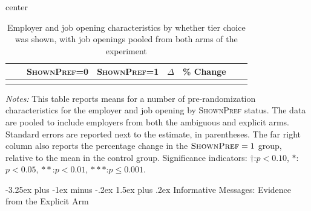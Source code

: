 \documentclass[12pt]{article}
\makeatletter
\renewcommand{\subsection}{%
  \@startsection{subsection}{2}{\z@}%
  {-3.25ex plus -1ex minus -.2ex}%
  {1.5ex plus .2ex}%
  {\normalfont\large\bfseries}%
}
\newcommand{\starlanguage}{Significance indicators: $\dagger$:$p < 0.10$, $*$:$p < 0.05$, $**$:$p < 0.01$, $***$:$p \le 0.001$.}
\makeatother
\begin{document}
\begin{table}[h!]
\begin{center}
\caption{Employer and job opening characteristics by whether tier choice was shown, with job openings pooled from both arms of the experiment}
\label{tab:balance_big}
\begin{small}
\begin{adjustbox}{center}
\begin{tabular}{lllccccc}
\toprule
&   & \multicolumn{1}{c}{\parbox[t][][t]{2.3cm}{{\footnotesize \textsc{ShownPref}=0}}}
&     \multicolumn{1}{c}{\parbox[t][][t]{2.3cm}{\footnotesize  \textsc{ShownPref=1}}}
&     \multicolumn{1}{c}{\parbox[t][][t]{2.0cm}{$\Delta$}}
&     \multicolumn{1}{c}{\parbox[t][][t]{1cm}{\% Change}}
\\
\hline

 \\
\bottomrule
\end{tabular}
\end{adjustbox}
\end{small}
\end{center}
\begin{minipage}{1.0 \textwidth}
\begin{footnotesize}
\begin{singlespace}
  \emph{Notes:} This table reports means for a number of pre-randomization characteristics for the employer and job opening by \textsc{ShownPref} status.
  The data are pooled to include employers from both the ambiguous and explicit arms.
Standard errors are reported next to the estimate, in parentheses.
The far right column also reports the percentage change in the $\textsc{ShownPref}=1$ group, relative to the mean in the control group. 
\starlanguage
\end{singlespace}
\end{footnotesize}
\end{minipage}
\end{table}




\subsection{Informative Messages: Evidence from the Explicit Arm} \label{online_app:informative_messages}
\end{document}
